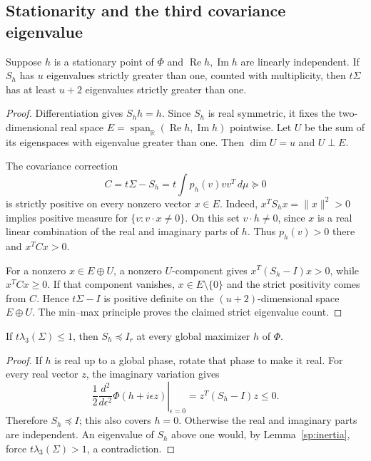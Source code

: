 \subsection{Stationarity and the third covariance eigenvalue}

\begin{lemma}\label{sp:inertia}
Suppose \(h\) is a stationary point of \(\Phi\) and
\(\operatorname{Re}h,\operatorname{Im}h\) are linearly independent.
If \(S_h\) has \(u\) eigenvalues strictly greater than one, counted
with multiplicity, then \(t\Sigma\) has at least \(u+2\) eigenvalues
strictly greater than one.
\end{lemma}
\begin{proof}
Differentiation gives \(S_hh=h\). Since \(S_h\) is real symmetric,
it fixes the two-dimensional real space
\(E=\operatorname{span}_{\mathbb R}(\operatorname{Re}h,
\operatorname{Im}h)\) pointwise. Let \(U\) be the sum of its
eigenspaces with eigenvalue greater than one. Then
\(\dim U=u\) and \(U\perp E\).

The covariance correction
\begin{equation}\label{sp:correction}
 C=t\Sigma-S_h=t\int p_h(v)vv^T\,d\mu\succeq0
\end{equation}
is strictly positive on every nonzero vector \(x\in E\). Indeed,
\(x^TS_hx=\|x\|^2>0\) implies positive measure for
\(\{v:v\cdot x\ne0\}\). On this set \(v\cdot h\ne0\), since
\(x\) is a real linear combination of the real and imaginary parts
of \(h\). Thus \(p_h(v)>0\) there and \(x^TCx>0\).

For a nonzero \(x\in E\oplus U\), a nonzero \(U\)-component gives
\(x^T(S_h-I)x>0\), while \(x^TCx\ge0\). If that component
vanishes, \(x\in E\setminus\{0\}\) and the strict positivity
comes from \(C\). Hence \(t\Sigma-I\) is positive definite on
the \((u+2)\)-dimensional space \(E\oplus U\). The min--max
principle proves the claimed strict eigenvalue count.
\end{proof}

\begin{lemma}\label{sp:maximizer-contraction}
If \(t\lambda_3(\Sigma)\le1\), then \(S_h\preceq I_r\) at
every global maximizer \(h\) of \(\Phi\).
\end{lemma}
\begin{proof}
If \(h\) is real up to a global phase, rotate that phase to make it
real. For every real vector \(z\), the imaginary variation gives
\[
 \frac12\left.\frac{d^2}{d\epsilon^2}
       \Phi(h+i\epsilon z)\right|_{\epsilon=0}
 =z^T(S_h-I)z\le0.
\]
Therefore \(S_h\preceq I\); this also covers \(h=0\).
Otherwise the real and imaginary parts are independent. An eigenvalue
of \(S_h\) above one would, by Lemma~\ref{sp:inertia}, force
\(t\lambda_3(\Sigma)>1\), a contradiction.
\end{proof}

